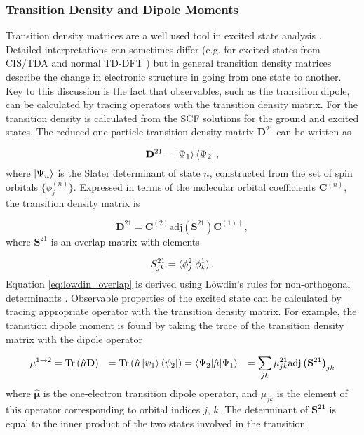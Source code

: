 \subsubsection{Transition Density and Dipole Moments}
\label{subsec:dscf_transition_density}
Transition density matrices are a well used tool in excited state analysis \cite{McWeeny1960, Tretiak2002}. 
Detailed interpretations can sometimes differ (e.g. for excited states from CIS/TDA 
and normal TD-DFT \cite{Etienne2015}) but in general transition density matrices
describe the change in electronic structure in going from one state to another.
Key to this discussion is the fact that observables, such as the transition dipole, 
can be calculated by tracing operators with the transition density matrix. For \dscf 
the transition density is calculated from the SCF solutions for the ground and excited
states. The reduced one-particle transition density matrix $\mathbf{D}^{21}$ can
be written as

\begin{equation}
\mathbf{D}^{21} = \ket{\Psi_1} \bra{\Psi_2},
\end{equation}
%
where $\ket{\Psi_n}$ is the Slater determinant of state $n$, constructed from the
set of spin orbitals $\{ \phi_{j}^{\left(n\right)} \} $. Expressed in terms of the
molecular orbital coefficients $\mathbf{C}^{\left(n\right)}$, the transition density
matrix is

\begin{equation}
\mathbf{D}^{21} = \mathbf{C}^{\left(2\right)} \text{adj}\left(\mathbf{S}^{21}\right) \mathbf{C}^{\left(1\right) \dagger},
\end{equation}
%
where $\mathbf{S}^{21}$ is an overlap matrix with elements 

\begin{equation}
S^{21}_{jk} = \braket{\phi^2_j|\phi^1_k}.
\label{eq:lowdin_overlap}
\end{equation}
%
Equation \ref{eq:lowdin_overlap} is derived using L{\"o}wdin's rules for non-orthogonal
determinants \cite{Lowdin1955}. Observable properties of the excited state can be
calculated by tracing appropriate operator with the transition density matrix. For
example, the transition dipole moment is found by taking the trace of the transition
density matrix with the dipole operator

\begin{equation}
    \begin{aligned}
        \mu^{1\rightarrow2} &= \text{Tr}\left(\hat{\mu} \mathbf{D}\right)
        &= \text{Tr}\left(\hat{\mu} \ket{\psi_1} \bra{\psi_2}\right)
        &= \braket{\Psi_2|\hat{\mathbf{\mu}}|\Psi_1} 
        &= \sum_{jk} \mathbf{\mu}_{jk}^{21} \text{adj} \left( \mathbf{S}^{21}\right)_{jk}
    \end{aligned}
\end{equation}
%
where $\hat{\mathbf{\mu}}$ is the one-electron transition dipole operator, and
$\mu_{jk}$ is the element of this operator corresponding to orbital indices $j$, $k$.
The determinant of $\mathbf{S^{21}}$ is equal to the inner product of the two states
involved in the transition

